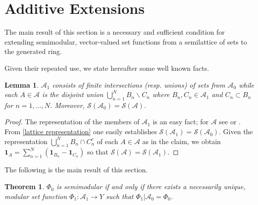 \documentclass[11pt]{amsart}
\newtheorem{theorem}{Theorem}
\theoremstyle{plain}
\newtheorem{lemma}{Lemma}
\begin{document}
\section{Additive Extensions}
\label{sec pettis}

The main result of this section is a necessary and sufficient condition for extending 
semimodular, vector-valued set functions from a semilattice of sets to the generated 
ring. 

Given their repeated use, we state hereafter some well known facts. 

\begin{lemma} 
\label{lemma semilattice} 
${\mathscr{A}}_1$ consists of finite intersections (resp. unions) of sets from ${\mathscr{A}}_0$ 
while each $A\in{\mathscr{A}}$ is the disjoint union $\bigcup_{n=1}^NB_n\backslash C_n$ where 
$B_n,C_n\in{\mathscr{A}}_1$ and $C_n\subset B_n$ for $n=1,\ldots,N$. Moreover, 
${\mathscr{S}}({\mathscr{A}}_0)={\mathscr{S}}({\mathscr{A}})$.
\end{lemma}

\begin{proof} 
The representation of the members of ${\mathscr{A}}_1$ is an easy fact; for ${\mathscr{A}}$ see 
\cite[p. 26]{halmos} or \cite[theorem 1.1.9, p. 4]{rao}. From \eqref{lattice representation} 
one easily establishes ${\mathscr{S}}({\mathscr{A}}_1)={\mathscr{S}}({\mathscr{A}}_0)$. Given the representation 
$\bigcup_{n=1}^NB_n\cap C_n^c$ of each $A\in{\mathscr{A}}$ as in the claim, we obtain 
${\mathbf{1}_{{A}}}=\sum_{n=1}^N({\mathbf{1}_{{B_n}}}-{\mathbf{1}_{{C_n}}})$ so that ${\mathscr{S}}({\mathscr{A}})={\mathscr{S}}({\mathscr{A}}_1)$. 
\end{proof}

The following is the main result of this section. 

\begin{theorem} 
\label{th extension} 
$\Phi_0$ is semimodular if and only if there exists a necessarily unique, modular set 
function $\Phi_1:{\mathscr{A}}_1\to Y$ such that ${\left.{\Phi_1}\right\vert {{\mathscr{A}}_0}}=\Phi_0$. 
\end{theorem}
\end{document}
